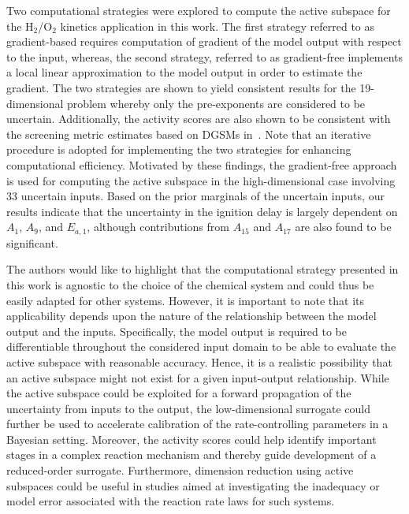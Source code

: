 Two computational strategies were explored to compute the active subspace for the H$_2$/O$_2$
kinetics application in this work. The first strategy referred to as gradient-based requires computation of gradient of the 
model output with respect to the input, whereas, the second strategy, referred to as gradient-free implements a local
linear approximation to the model output in order to estimate the gradient. The two strategies are shown to yield
consistent results for the 19-dimensional problem whereby only the pre-exponents are considered to be uncertain.
Additionally, the activity scores are also shown to be consistent with the screening metric estimates based on
DGSMs in~\cite{Vohra:2018}. Note that an iterative procedure is adopted for implementing the two strategies
for enhancing computational efficiency. 
Motivated by these findings, the gradient-free approach is used for computing the active subspace in the high-dimensional
case involving 33 uncertain inputs. Based on the prior marginals of the uncertain inputs, our results
indicate that the uncertainty in the ignition delay is largely dependent on $A_1$, $A_9$, and $E_{a,1}$, although
 contributions from $A_{15}$ and $A_{17}$ are also found to be significant. 
 
 The authors would like to highlight that the computational strategy presented in this work is agnostic to the choice
 of the chemical system and could thus be easily adapted for other systems. However, it is important to note that
 its applicability depends upon the nature of the relationship between the model output and the inputs. Specifically,
 the model output is required to be differentiable throughout the considered input domain to be able to evaluate
 the active subspace with reasonable accuracy. Hence, it is a realistic possibility that an active subspace might not
 exist for a given input-output relationship. While the active subspace could be exploited for a forward propagation of
 the uncertainty from inputs to the output, the low-dimensional surrogate could further be used to accelerate 
 calibration of the rate-controlling parameters in a Bayesian setting. Moreover, the activity scores could help
 identify important stages in a complex reaction mechanism and thereby guide development of a reduced-order
 surrogate. Furthermore, dimension reduction using active subspaces could be useful in studies aimed at
 investigating the inadequacy or model error associated with the reaction rate laws for such systems.  
 
 
 
 
 
 
 
